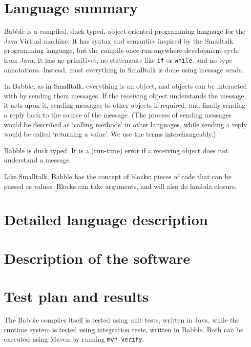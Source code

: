 \documentclass[a4paper]{article}
\begin{document}
\begin{titlepage}
\maketitle
\end{titlepage}

\section{Language summary}

Babble is a compiled, duck-typed, object-oriented programming language for the Java Virtual machine.
It has syntax and semantics inspired by the Smalltalk programming language, but the compile-once-run-anywhere development cycle from Java.
It has no primitives, no statements like \texttt{if} or \texttt{while}, and no type annotations.
Instead, most everything in Smalltalk is done using message sends.

In Babble, as in Smalltalk, everything is an object, and objects can be interacted with by sending them messages.
If the receiving object understands the message, it acts upon it, sending messages to other objects if required, and finally sending a reply back to the source of the message.
(The process of sending messages would be described as `calling methods' in other languages, while sending a reply would be called `returning a value'.
We use the terms interchangeably.)

Babble is duck typed.
It is a (run-time) error if a receiving object does not understand a message.

Like Smalltalk, Babble has the concept of blocks: pieces of code that can be passed as values.
Blocks can take arguments, and will also do lambda closure.

\section{Detailed language description}

\section{Description of the software}

\section{Test plan and results}

The Babble compiler itself is tested using unit tests, written in Java, while the runtime system is tested using integration tests, written in Babble.
Both can be executed using Maven by running \texttt{mvn verify}.
\end{document}
